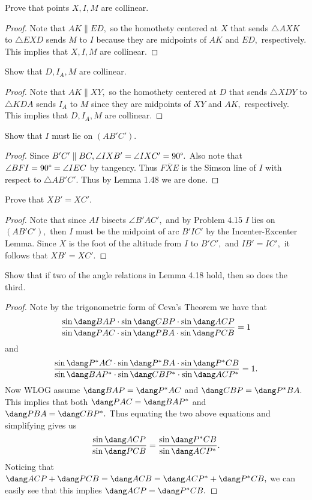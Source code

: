 \documentclass[letterpaper,oneside]{scrartcl}
\providecommand{\ol}{\overline}
\begin{document}
\begin{problem*}
  [4.12]
  Prove that points $X,I,M$ are collinear.
\end{problem*}
\begin{proof}
  Note that $AK \parallel ED,$ so the homothety centered at $X$ that sends $\triangle AXK$ to $\triangle EXD$ sends $M$ to $I$ because they are midpoints of $AK$ and $ED,$ respectively. This implies that $X,I,M$ are collinear.
\end{proof}

\begin{problem*}
  [4.13]
  Show that $D,I_A,M$ are collinear.
\end{problem*}
\begin{proof}
  Note that $AK \parallel XY,$ so the homothety centered at $D$ that sends $\triangle XDY$ to $\triangle KDA$ sends $I_A$ to $M$ since they are midpoints of $XY$ and $AK,$ respectively. This implies that $D,I_A,M$ are collinear.
\end{proof}

\begin{problem*}
  [4.15]
  Show that $I$ must lie on $(AB'C').$
\end{problem*}
\begin{proof}
  Since $B'C' \parallel BC, \angle IXB' = \angle IXC' = 90\degree.$ Also note that $\angle BFI = 90\degree = \angle IEC$ by tangency. Thus $\ol{FXE}$ is the Simson line of $I$ with respect to $\triangle AB'C'.$ Thus by Lemma 1.48 we are done.
\end{proof}

\begin{problem*}
  [4.16]
  Prove that $XB'=XC'.$
\end{problem*}
\begin{proof}
  Note that since $AI$ bisects $\angle B'AC',$ and by Problem 4.15 $I$ lies on $(AB'C'),$ then $I$ must be the midpoint of arc $B'IC'$ by the Incenter-Excenter Lemma. Since $X$ is the foot of the altitude from $I$ to $B'C',$ and $IB'=IC',$ it follows that $XB' = XC'.$
\end{proof}

\begin{problem*}
  [4.19]
  Show that if two of the angle relations in Lemma 4.18 hold, then so does the third.
\end{problem*}
\begin{proof}
  Note by the trigonometric form of Ceva's Theorem we have that
  $$\frac{\sin\dang BAP \cdot \sin\dang CBP \cdot \sin\dang ACP}{\sin\dang PAC \cdot \sin\dang PBA \cdot \sin\dang PCB} = 1$$ and
  $$\frac{\sin\dang P^*AC \cdot \sin\dang P^*BA \cdot \sin\dang P^*CB}{\sin\dang BAP^* \cdot \sin\dang CBP^* \cdot \sin\dang ACP^*} = 1.$$
  Now WLOG assume $\dang BAP = \dang P^*AC$ and $\dang CBP = \dang P^*BA.$ This implies that both $\dang PAC = \dang BAP^*$ and $\dang PBA = \dang CBP^*.$ Thus equating the two above equations and simplifying gives us
  $$\frac{\sin\dang ACP}{\sin\dang PCB} = \frac{\sin \dang P^*CB}{\sin\dang ACP^*}.$$ Noticing that $\dang ACP + \dang PCB = \dang ACB = \dang ACP^*+\dang P^*CB,$ we can easily see that this implies $\dang ACP = \dang P^*CB.$
\end{proof}
\end{document}
